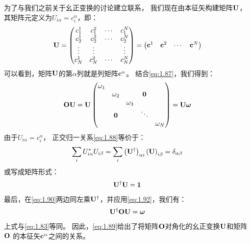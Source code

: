 为了与我们之前关于幺正变换的讨论建立联系，
我们现在由本征矢构建矩阵$\mathbf U$，
其矩阵元定义为$U_{i\alpha} = c_i^\alpha$，即：
\begin{equation}
 \mathbf{U} = \begin{pmatrix}
     c_1^1     &c_1^2     &\cdots &c_1^N \\
     c_2^1     &c_2^2     &\cdots &c_2^N \\
     \vdots &\vdots &                &\vdots\\
     c_N^1     &c_N^2     &\cdots &c_N^N
 \end{pmatrix} = \begin{pmatrix}
     \mathbf{c}^1 &\mathbf{c}^2 &\cdots &\mathbf{c}^N
 \end{pmatrix}
 \label{eq:1.89}
\end{equation}
可以看到，矩阵$\mathbf U$的第$\alpha$列就是列矩阵$\mathbf{c}^\alpha$。
结合\autoref{eq:1.87}，我们得到：
\begin{equation}
 \mathbf{OU} = \mathbf{U} \begin{pmatrix}
     \omega_1     & & & &\\
          &\omega_2 &     &\mathbf{0} &\\
          & &\omega_3 & &\\
          &\mathbf{0} & & \ddots & \\
          & &     & &\omega_N
 \end{pmatrix} = \mathbf{U}\boldsymbol\omega
 \label{eq:1.90}
\end{equation}
由于$U_{i\alpha} = c_i^\alpha$，
正交归一关系\autoref{eq:1.88}等价于：
\begin{equation}
 \sum_i U_{i\alpha}^\ast U_{i\beta} = \sum_i \left(\mathbf U^\dagger\right)_{\alpha i}\left(\mathbf{U}\right)_{i\beta} = \delta_{\alpha\beta}
 \label{eq:1.91}
\end{equation}
或写成矩阵形式：
\begin{equation}
 \mathbf U^\dagger\mathbf{U} = \mathbf{1}
 \label{eq:1.92}
\end{equation}
最后，在\autoref{eq:1.90}两边同左乘$\mathbf U^\dagger$，并应用\autoref{eq:1.92}，我们有：
\begin{equation}
 \mathbf U^\dagger\mathbf{OU} = \boldsymbol\omega
 \label{eq:1.93}
\end{equation}
上式与\autoref{eq:1.83}等同。
因此，\autoref{eq:1.89}给出了将矩阵$\mathbf O$对角化的幺正变换$\mathbf U$和矩阵$\mathbf O$ 的本征矢$\mathbf{c}^\alpha$之间的关系。



